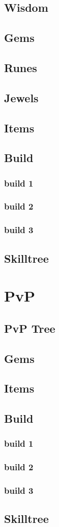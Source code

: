 \documentclass[14pt]{article}
\begin{document}
\subsection{Wisdom}
\subsection{Gems}
\subsection{Runes}
\subsection{Jewels}
\subsection{Items}
\subsection{Build}
\subsubsection{build 1}
\subsubsection{build 2}
\subsubsection{build 3}
\subsection{Skilltree}

\newpage

\section{PvP}
\subsection{PvP Tree}
\subsection{Gems}
\subsection{Items}
\subsection{Build}
\subsubsection{build 1}
\subsubsection{build 2}
\subsubsection{build 3}
\subsection{Skilltree}

\newpage
\end{document}
